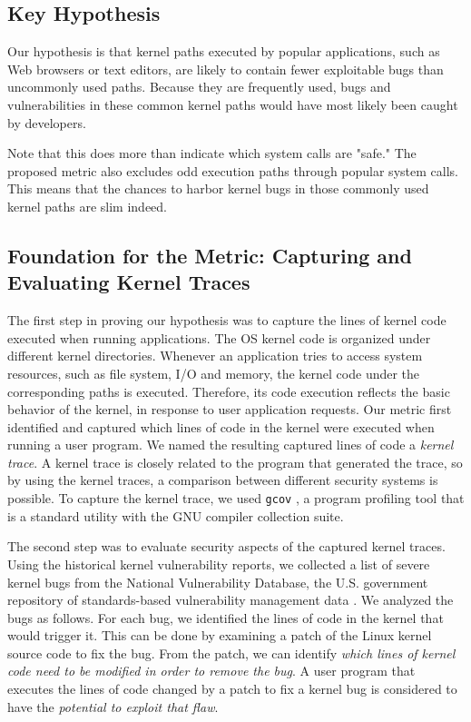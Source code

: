 \subsection{Key Hypothesis}

Our hypothesis is that kernel paths executed by popular applications,
such as Web browsers or text editors, are likely to contain fewer
exploitable bugs
than uncommonly used paths. %
Because they are frequently used, bugs and vulnerabilities in these common kernel paths
would have most likely been caught by developers.

Note that this does more than indicate which system calls are "safe."
The proposed metric also excludes odd execution paths
through popular system calls.
This means that the chances to harbor kernel bugs in those commonly used
kernel paths are slim indeed.

\subsection{Foundation for the Metric: Capturing and Evaluating Kernel Traces}

The first step in proving our hypothesis was to capture the lines of kernel
code executed
when running applications. The OS kernel code is organized under different
kernel directories.
Whenever an application tries to access system resources, such as file
system, I/O and memory, the kernel code under the corresponding paths is executed. Therefore,
its code execution reflects the basic behavior of the kernel, in response
to user application requests.
Our metric first identified and captured which lines of code in the kernel
were executed
when running a user program. We named the resulting captured lines of
code a \textit{kernel trace}.
A kernel trace is closely related to the program that generated the trace, so
by using the kernel traces, a comparison between different
security systems is possible.
To capture the kernel trace, we used \texttt{gcov} \cite{gcov}, a program profiling
tool that is a standard utility with the GNU compiler collection
suite.


The second step was to evaluate security aspects of the captured kernel traces.%
Using the historical kernel vulnerability reports, we collected a list of
severe kernel bugs from
the National Vulnerability Database, the U.S. government repository of
standards-based 
vulnerability management data \cite{NVD}. We analyzed the bugs as
follows. For each bug, we identified the lines of code
in the kernel that would trigger it. This can be done by examining
a patch of the Linux kernel source code to fix the bug. From the patch,
we can identify \textit{which lines of kernel code need to be modified in order to
remove the bug}.
A user program that executes the lines of code changed by a patch to fix a
kernel bug is considered to have the \textit{potential to exploit that flaw}.

